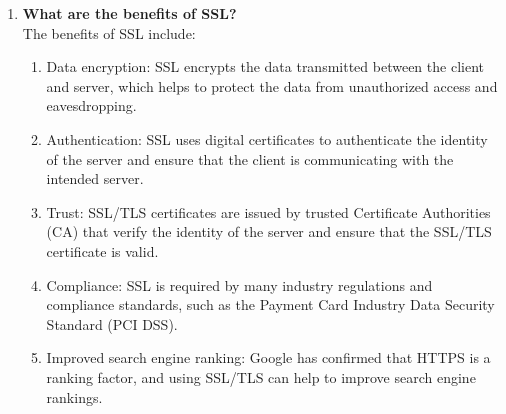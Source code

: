 \documentclass[11pt]{article}
\begin{document}
\begin{enumerate}
    \item \textbf{What are the benefits of SSL?}\\

          The benefits of SSL include:

          \begin{enumerate}
              \item Data encryption: SSL encrypts the data transmitted between the client and server, which helps to protect the data from unauthorized access and eavesdropping.
              \item Authentication: SSL uses digital certificates to authenticate the identity of the server and ensure that the client is communicating with the intended server.
              \item Trust: SSL/TLS certificates are issued by trusted Certificate Authorities (CA) that verify the identity of the server and ensure that the SSL/TLS certificate is valid.
              \item Compliance: SSL is required by many industry regulations and compliance standards, such as the Payment Card Industry Data Security Standard (PCI DSS).
              \item Improved search engine ranking: Google has confirmed that HTTPS is a ranking factor, and using SSL/TLS can help to improve search engine rankings.
          \end{enumerate}

\end{enumerate}
\end{document}
